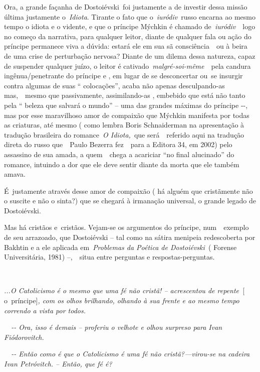 Ora, a grande façanha de Dostoiévski~foi justamente a de investir dessa
missão última justamente o~\emph{Idiota}. Tirante o fato que
o\emph{~iuródiv}~russo encarna ao mesmo tempo o idiota e o vidente, e
que o príncipe Mýchkin é chamado de\emph{~iuródiv}~~logo no começo da
narrativa, para qualquer leitor, diante de qualquer fala ou ação do
príncipe permanece viva a dúvida: estará ele em sua sã consciência~~ou à
beira de uma crise de perturbação nervosa? Diante de um dilema dessa
natureza, capaz de suspender qualquer juízo, o leitor é
cativado~\emph{malgré-soi-même}~~pela candura ingênua/penetrante do
príncipe e , em lugar de se desconcertar ou~se insurgir contra algumas
de suas `` colocações'', acaba não apenas desculpando-as mas,~~mesmo que
passivamente, assimilando-as , embebido que está não tanto pela ``
beleza que salvará o mundo'' -- uma das grandes máximas do príncipe
-\/-, mas por esse maravilhoso amor de compaixão que Mýchkin manifesta
por todas as criaturas, até mesmo ( como lembra Boris Schnaiderman na
apresentação à tradução brasileira do romance~\emph{O Idiota,}~que
será~~referido aqui na tradução direta do russo que~~Paulo Bezerra
fez~~para a Editora 34, em 2002) pelo assassino de sua amada, a
quem~~chega a acariciar ``no final alucinado'' do romance, intuindo a
dor que ele deve sentir diante da morta que ele também amava.

É~justamente através desse amor de compaixão ( há alguém que cristãmente
não o suscite e não o sinta?) que se chegará à irmanação universal, o
grande legado de Dostoiévski.

Mas há cristãos e~cristãos. Vejam-se os argumentos do príncipe,
num~~exemplo de seu arrazoado, que Dostoiévski -- tal como na sátira
menipeia redescoberta por Bakhtin e a ele aplicada em~\emph{Problemas da
Poética de Dostoiévski~}( Forense Universitária, 1981) --,~~situa entre
perguntas e respostas-perguntas.

\emph{~}

\emph{...O Catolicismo é o mesmo que uma fé não cristã! -- acrescentou
de repente~}{[} o\emph{~}príncipe{]}\emph{, com os olhos brilhando,
olhando à sua frente e ao mesmo tempo correndo a vista por todos.}

\emph{~~-\/- Ora, isso é demais -- proferiu o velhote e olhou surpreso
para Ivan Fiódorovitch.}

\emph{~~-\/- Então como é que o Catolicismo é uma fé não
cristã?---virou-se na cadeira Ivan Petróvitch. -- Então, que fé é?}


